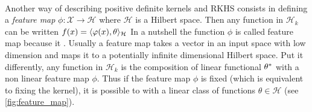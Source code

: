 \paragraph{}
Another way of describing positive definite kernels and \acs{RKHS} consists in
defining a \emph{feature map} $\phi:\mathcal{X}\to\mathcal{H}$ where
$\mathcal{H}$ is a Hilbert space.  Then any function in $\mathcal{H}_k$ can be
written $f(x)=\langle\varphi(x), \theta\rangle_{\mathcal{H}}$ In a nutshell the function
$\phi$ is called feature map because it . Usually a feature map takes a vector in an input space with low
dimension and maps it to a potentially infinite dimensional Hilbert space. Put
it differently, any function in $\mathcal{H}_k$ is the composition of linear
functional $\theta^*$ with a non linear feature map $\phi$. Thus if the
feature map $\phi$ is fixed (which is equivalent to fixing the kernel), it is
possible to  with a linear class of functions $\theta\in\mathcal{H}$
(see \cref{fig:feature_map}).
